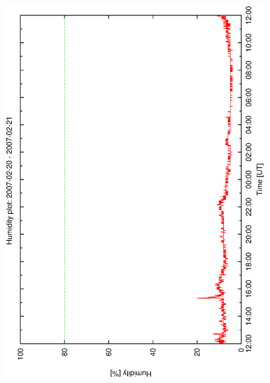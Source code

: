 \begin{figure}[htbp]
\begin{center}
{    \includegraphics[scale=0.25, angle=-90]{figures/ecs/hum_1_2007_02_20.eps}  
    \label{fig:hum_profile_2007_02_20}
  }
\end{center}
\end{figure}
